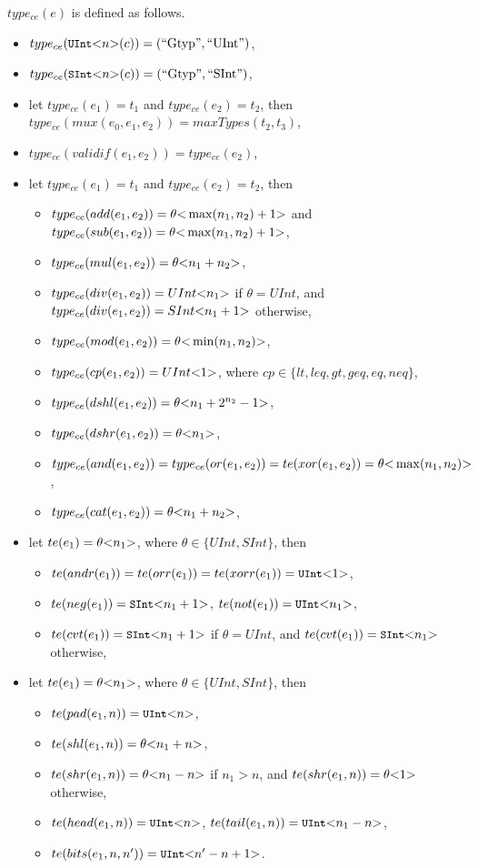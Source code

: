 {$type_{ce}(e)$ is defined as follows.
\begin{itemize}
\item $type_{ce}(\uint{n}(c)) = (\mbox{``Gtyp''}, \mbox{``UInt''})$,
%
\item $type_{ce}(\sint{n}(c)) = (\mbox{``Gtyp''}, \mbox{``SInt''})$,
%
\item let $type_{ce}(e_1) = t_1$ and $type_{ce}(e_2) = t_2$, then $type_{ce}(mux(e_0, e_1, e_2)) = maxTypes(t_2, t_3)$,
%
\item $type_{ce}(validif(e_1, e_2)) = type_{ce}(e_2)$,
%
\item let $type_{ce}(e_1) =t_1$ and $type_{ce}(e_2) = t_2$, then
\begin{itemize}
\item $type_{ce}(add(e_1, e_2)) =\theta \mbox{<} \max(n_1, n_2)+1 \mbox{>}$ and $type_{ce}(sub(e_1, e_2)) = \theta \mbox{<} \max(n_1, n_2)+1 \mbox{>}$,
%
\item $type_{ce}(mul(e_1, e_2)) = \theta \mbox{<} n_1+n_2 \mbox{>}$,
%
\item $type_{ce}(div(e_1, e_2)) = UInt \mbox{<} n_1 \mbox{>}$ if $\theta = UInt$, and $type_{ce}(div(e_1, e_2)) = SInt \mbox{<} n_1+1 \mbox{>}$ otherwise,
%
\item $type_{ce}(mod(e_1, e_2)) = \theta \mbox{<} \min(n_1,n_2) \mbox{>}$,
%
\item $type_{ce}(cp(e_1, e_2)) = UInt \mbox{<} 1 \mbox{>}$, where $cp \in \{lt, leq, gt, geq, eq, neq\}$,
%
\item $type_{ce}(dshl(e_1, e_2)) = \theta \mbox{<} n_1+2^{n_2}-1 \mbox{>}$,
%
\item $type_{ce}(dshr(e_1, e_2)) = \theta \mbox{<} n_1 \mbox{>}$,
%
\item $type_{ce}(and(e_1, e_2)) = type_{ce}(or(e_1, e_2)) =  te(xor(e_1, e_2)) = \theta \mbox{<} \max(n_1, n_2) \mbox{>}$,
%
\item $type_{ce}(cat(e_1, e_2)) = \theta \mbox{<} n_1 + n_2 \mbox{>}$,
\end{itemize}
%
\item let $te(e_1) = \theta \mbox{<} n_1 \mbox{>}$, where $\theta \in \{UInt, SInt\}$, then
\begin{itemize}
\item $te(andr(e_1)) = te(orr(e_1)) =  te(xorr(e_1)) = \uint{1}$,
%
\item $te(neg(e_1)) = \sint{n_1 +1}$, $te(not(e_1)) =  \uint{n_1}$,
%
\item $te(cvt(e_1)) = \sint{n_1 +1}$ if $\theta = UInt$, and $te(cvt(e_1)) =  \sint{n_1}$ otherwise,
\end{itemize}
%
\item let $te(e_1) = \theta \mbox{<} n_1 \mbox{>}$, where $\theta \in \{UInt, SInt\}$, then
\begin{itemize}
\item $te(pad(e_1, n)) = \uint{n}$,
%
\item $te(shl(e_1,n)) = \theta \mbox{<} n_1 + n \mbox{>}$,
%
\item $te(shr(e_1, n)) = \theta \mbox{<} n_1-n \mbox{>}$ if $n_1 > n$, and $te(shr(e_1, n)) =  \theta \mbox{<} 1 \mbox{>}$ otherwise,
%
\item $te(head(e_1, n)) = \uint{n}$, $te(tail(e_1, n)) = \uint{n_1-n}$,
%
\item $te(bits(e_1, n, n')) = \uint{n'-n+1}$.
\end{itemize}
%
\end{itemize}
}
